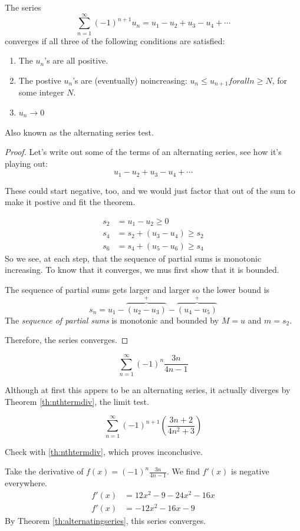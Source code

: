 \begin{theorem}\label{th:alternatingseries}\cite[p.~568]{thomas}
  The series
  \[ \sum^\infty_{n=1} (-1)^{n+1} u_n = u_1 - u_2 + u_3 - u_4 + \cdots \]
  converges if all three of the following conditions are satisfied:
  \begin{enumerate}
    \item The $u_n$'s are all positive.
    \item The postive $u_n$'s are (eventually) noincreasing: $u_n \leq u_{n+1}
      for all n \geq N$, for some integer $N$.
    \item $u_n \to 0$
  \end{enumerate}
  \begin{note}
    Also known as the alternating series test.
  \end{note}
\end{theorem}
\begin{proof}
  Let's write out some of the terms of an alternating series, see how it's
  playing out:
  \[ u_1 - u_2 + u_3 - u_4 + \cdots\]
  \begin{remark}
    These could start negative, too, and we would just factor that out of the sum
    to make it postive and fit the theorem.
  \end{remark}
  \begin{align*}
    s_2 &= u_1 - u_2 \geq 0 \\
    s_4 &= s_2 + (u_3 - u_4) \geq s_2 \\
    s_6 &= s_4 + (u_5 - u_6) \geq s_4
  \end{align*}
  So we see, at each step, that the sequence of partial sums is monotonic
  increasing. To know that it converges, we mus first show that it is bounded.

  The sequence of partial sums gets larger and larger so the lower bound is
  \[ s_n = u_1 - \overbrace{(u_2 - u_3)}^+ - \overbrace{(u_4 - u_5)}^+ \]
  The \emph{sequence of partial sums} is monotonic and bounded by $M=u$ and
  $m=s_2$.

  Therefore, the series converges.
\end{proof}
\begin{ex}
  \[ \sum^\infty_{n=1} (-1)^n \frac{3n}{4n-1} \]

  Although at first this appers to be an alternating series, it actually
  diverges by Theorem \ref{th:nthtermdiv}, the limit test.
\end{ex}
\begin{ex}
  \[ \sum^\infty_{n=1} (-1)^{n+1} \left( \frac{3n+2}{4n^2+3} \right) \]
  \begin{sol}
    Check with \ref{th:nthtermdiv}, which proves inconclusive.

    Take the derivative of $f(x)=(-1)^n \frac{3n}{4n-1}$. We find $f'(x)$ is
    negative everywhere.
    \begin{align*}
      f'(x)&=12x^2-9-24x^2-16x \\
      f'(x)&=-12x^2-16x-9
    \end{align*}
    By Theorem \ref{th:alternatingseries}, this series converges.
  \end{sol}
\end{ex}

